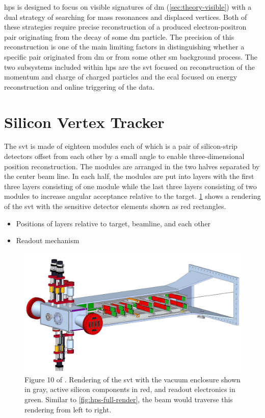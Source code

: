 \ac{hps} is designed to focus on visible signatures of \ac{dm} (\cref{sec:theory-visible}) with
a dual strategy of searching for mass resonances and displaced vertices. Both of these strategies
require precise reconstruction of a produced electron-positron pair originating from the decay of
some \ac{dm} particle. The precision of this reconstruction is one of the main limiting factors
in distinguishing whether a specific pair originated from \ac{dm} or from some other \ac{sm}
background process. The two subsystems included within \ac{hps} are the \ac{svt} focused
on reconstruction of the momentum and charge of charged particles
and the \ac{ecal} focused on energy reconstruction and online triggering of the data.

\section{Silicon Vertex Tracker}
The \ac{svt} is made of eighteen modules each of which is a pair of silicon-strip detectors
offset from each other by a small angle to enable three-dimensional position reconstruction.
The modules are arranged in the two halves separated by the center beam line. In each half,
the modules are put into layers with the first three layers consisting of one module while
the last three layers consisting of two modules to increase angular acceptance relative
to the target. \cref{fig:hps-svt-render} shows a rendering of the \ac{svt} with the sensitive
detector elements shown as red rectangles.

\begin{todoenv}
    \begin{itemize}
        \item Positions of layers relative to target, beamline, and each other
        \item Readout mechanism
    \end{itemize}
\end{todoenv}

\begin{figure}
    \centering
    \includegraphics*[width=\textwidth]{figures/hps/experiment/smkcarty-thesis-fig-10-svt-render.png}
    \caption{
        Figure 10 of \cite{skmccarty-thesis-2020}. Rendering of the \ac{svt} with the vacuum
        enclosure shown in gray, active silicon components in red, and readout electronics in
        green. Similar to \cref{fig:hps-full-render}, the beam would traverse this rendering
        from left to right.
    }
    \label{fig:hps-svt-render}
\end{figure}

